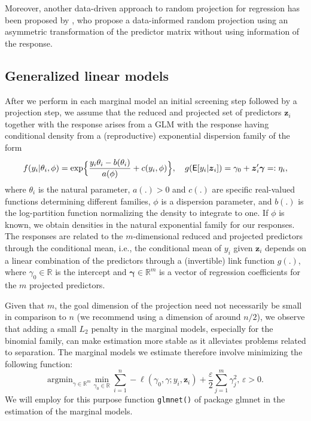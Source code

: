 \documentclass[
  article]{jss}
\begin{document}
Moreover, another data-driven approach to random projection for
regression has been proposed by \citet{ryder2019asymmetric}, who propose
a data-informed random projection using an asymmetric transformation of
the predictor matrix without using information of the response.

\subsection{Generalized linear models}\label{generalized-linear-models}

After we perform in each marginal model an initial screening step
followed by a projection step, we assume that the reduced and projected
set of predictors \(\boldsymbol{z}_i\) together with the response arises
from a GLM with the response having conditional density from a
(reproductive) exponential dispersion family of the form
\begin{align}\label{eqn:y_density}
  f(y_i|\theta_i,\phi) = \exp\Bigl\{\frac{y_i\theta_i- b(\theta_i)}{a(\phi)} + c(y_i,\phi)\Bigr\},
  \quad
    g(\mathsf{E}[y_i|\boldsymbol{z}_i]) = \gamma_0 + \boldsymbol{z}_i'\boldsymbol{\gamma}=:\eta_i,
\end{align} where \(\theta_i\) is the natural parameter, \(a(.)>0\) and
\(c(.)\) are specific real-valued functions determining different
families, \(\phi\) is a dispersion parameter, and \(b(.)\) is the
log-partition function normalizing the density to integrate to one. If
\(\phi\) is known, we obtain densities in the natural exponential family
for our responses. The responses are related to the \(m\)-dimensional
reduced and projected predictors through the conditional mean, i.e., the
conditional mean of \(y_i\) given \({\boldsymbol{z}}_i\) depends on a
linear combination of the predictors through a (invertible) link
function \(g(.)\), where \(\gamma_0\in\mathbb{R}\) is the intercept and
\(\boldsymbol{\gamma}\in\mathbb{R}^m\) is a vector of regression
coefficients for the \(m\) projected predictors.

Given that \(m\), the goal dimension of the projection need not
necessarily be small in comparison to \(n\) (we recommend using a
dimension of around \(n/2\)), we observe that adding a small \(L_2\)
penalty in the marginal models, especially for the binomial family, can
make estimation more stable as it alleviates problems related to
separation. The marginal models we estimate therefore involve minimizing
the following function: \[
 \text{argmin}_{{\gamma}\in\mathbb{R}^m}\min_{\gamma_0\in\mathbb{R}}  \sum_{i=1}^n -\ell(\gamma_0, \gamma;y_i,\boldsymbol{z}_i) + \frac{\varepsilon}{2}\sum_{j=1}^m{\gamma}_j^2, \, \varepsilon > 0.
\] We will employ for this purpose function \texttt{glmnet()} of package
{glmnet} \citep{glmnet2023} in the estimation of the marginal models.
\end{document}
